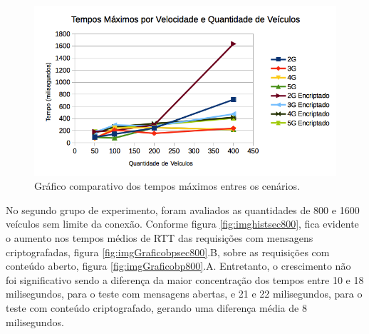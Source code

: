 \documentclass[
	12pt,				%
	oneside,			%
	a4paper,			%
	english,			%
	brazil				%
	]{abntex2ppgsi}
\begin{document}
\begin{figure}[h!]
	\centering
	\includegraphics[width=0.7\columnwidth]{images/grafico_tempo_max.png}
	\caption{Gráfico comparativo dos tempos máximos entres os cenários.}
	\label{fig:graficotempomax}
\end{figure}

  


No segundo grupo de experimento, foram avaliados as quantidades de 800 e 1600 veículos sem limite da conexão. Conforme figura \ref{fig:imghistsec800}, fica evidente o aumento nos tempos médios de RTT das requisições com mensagens criptografadas, figura \ref{fig:imgGraficobpsec800}.B, sobre as requisições com conteúdo aberto, figura \ref{fig:imgGraficobp800}.A. Entretanto, o crescimento não foi significativo sendo a diferença da maior concentração dos tempos entre 10 e 18 milisegundos, para o teste com mensagens abertas, e 21 e 22 milisegundos, para o teste com conteúdo criptografado, gerando uma diferença média de 8 milisegundos.
\end{document}
